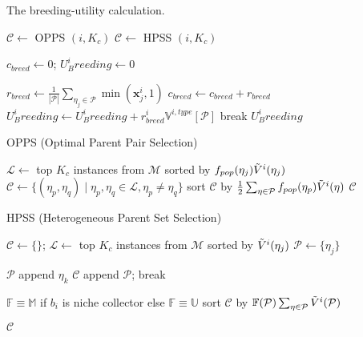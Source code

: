\documentclass[conference]{IEEEtran}
\theoremstyle{plain}
\begin{document}
\begin{algorithm}[t!]
    \small
    \caption{The breeding-utility calculation.}
    \label{alg:breeding-utility}
    \begin{algorithmic}[1]
         $\mathcal{C}\gets$ OPPS $(i, K_c)$
    \EndIf
         $\mathcal{C}\gets$ HPSS $(i, K_c)$
    \EndIf

    \State $c_{breed}\gets 0$; $U^i_Breeding\gets 0$

        \State $r_{breed}\gets \frac{1}{|\mathcal{P}|}\sum_{\eta_j\in \mathcal{P}} \min(\mathbf{x}^i_j, 1)$
        \State $c_{breed}\gets c_{breed}+r_{breed}$
        \State $U^i_Breeding\gets U^i_Breeding + r_{breed}^i\mathbb{V}^{i, type}[\mathcal{P}]$
            break
        \EndIf
    \EndFor
    \State\Return $U^i_Breeding$
    \EndProcedure
    \end{algorithmic}
\end{algorithm}
\begin{algorithm}[t!]
    \small
    \caption{OPPS (Optimal Parent Pair Selection)}
    \label{alg:homos}
    \begin{algorithmic}[1]
    \State $\mathcal{L}\gets$ top $K_c$ instances from $\mathcal{M}$ sorted by $f_{pop}(\eta_j)\Tilde{V}^i(\eta_j)$
    \State $\mathcal{C}\gets \{(\eta_p, \eta_q) \mid \eta_p, \eta_q\in \mathcal{L},  \eta_p\neq \eta_q\}$
    \State sort $\mathcal{C}$ by $\frac{1}{2}\sum_{\eta\in\mathcal{P}}f_{pop}(\eta_p)\Tilde{V}^i(\eta)$
    \State \Return $\mathcal{C}$
    \EndProcedure
    \end{algorithmic}
\end{algorithm}
\begin{algorithm}[t!]
    \small
    \caption{HPSS (Heterogeneous Parent Set Selection)}
    \label{alg:heters}
    \begin{algorithmic}[1]

    \State$\mathcal{C}\gets\{\}$; $\mathcal{L}\gets$ top $K_c$ instances from $\mathcal{M}$ sorted by $\Tilde{V}^i(\eta_j)$
        \State $\mathcal{P}\gets\{\eta_j\}$

        $\mathcal{P}$ append $\eta_k$
        \EndIf
        $\mathcal{C}$ append $\mathcal{P}$; break
        \EndIf

        \EndFor
    \EndFor
    \State $\mathbb{F}\equiv \mathbb{M}$ if $b_i$ is niche collector else $\mathbb{F}\equiv \mathbb{U}$ 
    \State sort $\mathcal{C}$ by $\mathbb{F}(\mathcal{P})\sum_{\eta\in\mathcal{P}}\Tilde{V}^i(\mathcal{P})$ 

    \State \Return $\mathcal{C}$
    \EndProcedure
    \end{algorithmic}
\end{algorithm}
\end{document}
